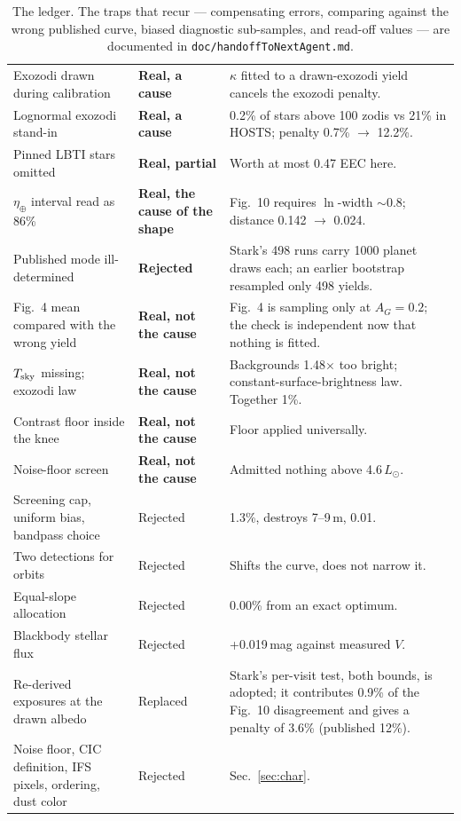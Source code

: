 \documentclass[11pt,a4paper]{article}
\begin{document}
\begin{table}[htbp]
\begin{tabular}{p{4.6cm}p{2.6cm}p{8.0cm}}
Exozodi drawn during calibration & \textbf{Real, a cause} & $\kappa$ fitted to a drawn-exozodi yield cancels the exozodi penalty. \\
Lognormal exozodi stand-in & \textbf{Real, a cause} & 0.2\% of stars above 100 zodis vs 21\% in HOSTS; penalty 0.7\% $\to$ 12.2\%. \\
Pinned LBTI stars omitted & \textbf{Real, partial} & Worth at most 0.47 EEC here. \\
$\eta_\oplus$ interval read as 86\% & \textbf{Real, the cause of the shape} & Fig.~10 requires $\ln$-width $\sim$0.8; distance 0.142 $\to$ 0.024. \\
Published mode ill-determined & \textbf{Rejected} & Stark's 498 runs carry 1000 planet draws each; an earlier bootstrap resampled only 498 yields. \\
Fig.~4 mean compared with the wrong yield & \textbf{Real, not the cause} & Fig.~4 is sampling only at $A_G = 0.2$; the check is independent now that nothing is fitted. \\
$T_{\rm sky}$ missing; exozodi law & \textbf{Real, not the cause} & Backgrounds 1.48$\times$ too bright; constant-surface-brightness law. Together 1\%. \\
Contrast floor inside the knee & \textbf{Real, not the cause} & Floor applied universally. \\
Noise-floor screen & \textbf{Real, not the cause} & Admitted nothing above 4.6\,$L_\odot$. \\
Screening cap, uniform bias, bandpass choice & Rejected & 1.3\%, destroys 7--9\,m, 0.01. \\
Two detections for orbits & Rejected & Shifts the curve, does not narrow it. \\
Equal-slope allocation & Rejected & 0.00\% from an exact optimum. \\
Blackbody stellar flux & Rejected & +0.019\,mag against measured $V$. \\
Re-derived exposures at the drawn albedo & Replaced & Stark's per-visit test, both bounds, is adopted; it contributes 0.9\% of the Fig.~10 disagreement and gives a penalty of 3.6\% (published 12\%). \\
Noise floor, CIC definition, IFS pixels, ordering, dust color & Rejected & Sec.~\ref{sec:char}. \\
\bottomrule
\end{tabular}
\caption{The ledger. The traps that recur --- compensating errors, comparing against the wrong
published curve, biased diagnostic sub-samples, and read-off values --- are documented in
\texttt{doc/handoffToNextAgent.md}.}
\end{table}
\end{document}
